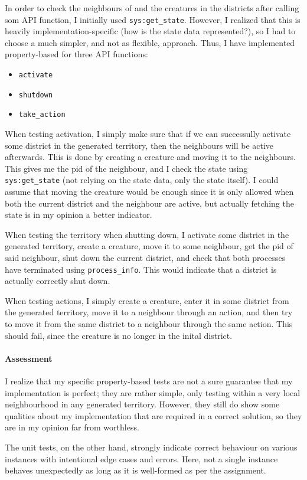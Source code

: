 \noindent In order to check the neighbours of and the creatures in the districts after calling som API function, I initially used \texttt{sys:get\_state}. However, I realized that this is heavily implementation-specific (how is the state data represented?), so I had to choose a much simpler, and not as flexible, approach.
Thus, I have implemented property-based for three API functions:
\begin{itemize}
  \item \texttt{activate}
  \item \texttt{shutdown}
  \item \texttt{take\_action}
\end{itemize}
When testing activation, I simply make sure that if we can successully activate some district in the generated territory, then the neighbours will be active afterwards. This is done by creating a creature and moving it to the neighbours. This gives me the pid of the neighbour, and I check the state using \texttt{sys:get\_state} (not relying on the state data, only the state itself). I could assume that moving the creature would be enough since it is only allowed when both the current district and the neighbour are active, but actually fetching the state is in my opinion a better indicator.

When testing the territory when shutting down, I activate some district in the generated territory, create a creature, move it to some neighbour, get the pid of said neighbour, shut down the current district, and check that both processes have terminated using \texttt{process\_info}. This would indicate that a district is actually correctly shut down.

When testing actions, I simply create a creature, enter it in some district from the generated territory, move it to a neighbour through an action, and then try to move it from the same district to a neighbour through the same action. This should fail, since the creature is no longer in the inital district.

\paragraph{Assessment} I realize that my specific property-based tests are not a sure guarantee that my implementation is perfect; they are rather simple, only testing within a very local neighbourhood in any generated territory. However, they still do show some qualities about my implementation that are required in a correct solution, so they are in my opinion far from worthless.

The unit tests, on the other hand, strongly indicate correct behaviour on various instances with intentional edge cases and errors. Here, not a single instance behaves unexpectedly as long as it is well-formed as per the assignment.
